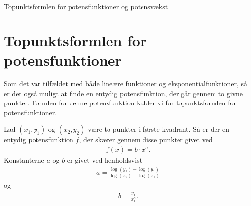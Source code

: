 \documentclass[12pt]{article}
\begin{document}




\begin{center}
\Huge
Topunktsformlen for potensfunktioner og potensvækst
\end{center}
\section*{Topunktsformlen for potensfunktioner}
Som det var tilfældet med både lineære funktioner og eksponentialfunktioner, så er det også muligt at finde en entydig potensfunktion, der går gennem to givne punkter. Formlen for denne potensfunktion kalder vi for topunktsformlen for potensfunktioner.
\begin{setn}
Lad $(x_1,y_1)$ og $(x_2,y_2)$ være to punkter i første kvadrant. Så er der en entydig potensfunktion $f$, der skærer gennem disse punkter givet ved
\begin{align*}
f(x) = b\cdot x^a.
\end{align*}
Konstanterne $a$ og $b$ er givet ved henholdsvist
\begin{align*}
a = \frac{\log(y_2)-\log(y_1)}{\log(x_2)-\log(x_1)}
\end{align*}
og
\begin{align*}
b = \frac{y_1}{x_1^{a}}.
\end{align*}
\end{setn}
\end{document}
